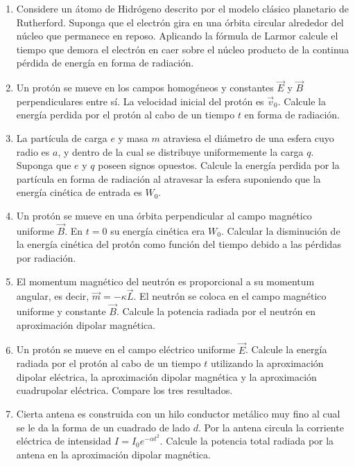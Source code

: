 \documentclass[12pt,a4paper]{book}
\begin{document}
\begin{enumerate}
\item Considere un átomo de Hidrógeno descrito por el modelo clásico planetario de Rutherford. Suponga que el electrón gira en una órbita circular alrededor del núcleo que permanece en reposo. Aplicando la fórmula de Larmor calcule el tiempo que demora el electrón en caer sobre el núcleo producto de la continua pérdida de energía en forma de radiación.

\item Un protón se mueve en los campos homogéneos y constantes $\vec{E}$ y $\vec{B}$ perpendiculares entre sí. La velocidad inicial del protón es $\vec{v}_0$. Calcule la energía perdida por el protón al cabo de un tiempo $t$ en forma de radiación.

\item La partícula de carga $e$ y masa $m$ atraviesa el diámetro de una esfera cuyo radio es $a$, y dentro de la cual se distribuye uniformemente la carga $q$. Suponga que $e$ y $q$ poseen signos opuestos. Calcule la energía perdida por la partícula en forma de radiación al atravesar la esfera suponiendo que la energía cinética de entrada es $W_0$.

\item Un protón se mueve en una órbita perpendicular al campo magnético uniforme $\vec{B}$. En $t=0$ su energía cinética era $W_0$. Calcular la disminución de la energía cinética del protón como función del tiempo debido a las pérdidas por radiación.

\item El momentum magnético del neutrón es proporcional a su momentum angular, es decir, $\vec{m} = -\kappa\vec{L}$. El neutrón se coloca en el campo magnético uniforme y constante $\vec{B}$. Calcule la potencia radiada por el neutrón en aproximación dipolar magnética.

\item Un protón se mueve en el campo eléctrico uniforme $\vec{E}$. Calcule la energía radiada por el protón al cabo de un tiempo $t$ utilizando la aproximación dipolar eléctrica, la aproximación dipolar magnética y la aproximación cuadrupolar eléctrica. Compare los tres resultados.

\item Cierta antena es construida con un hilo conductor metálico muy fino al cual se le da la forma de un cuadrado de lado $d$. Por la antena circula la corriente eléctrica de intensidad $I = I_0 e^{-\alpha t^2}$. Calcule la potencia total radiada por la antena en la aproximación dipolar magnética.


\end{enumerate}
\end{document}

